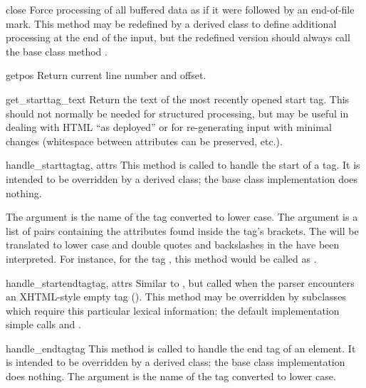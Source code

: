 \begin{methoddesc}{close}{}
Force processing of all buffered data as if it were followed by an
end-of-file mark.  This method may be redefined by a derived class to
define additional processing at the end of the input, but the
redefined version should always call the  base class
method .
\end{methoddesc}

\begin{methoddesc}{getpos}{}
Return current line number and offset.
\end{methoddesc}

\begin{methoddesc}{get_starttag_text}{}
Return the text of the most recently opened start tag.  This should
not normally be needed for structured processing, but may be useful in
dealing with HTML ``as deployed'' or for re-generating input with
minimal changes (whitespace between attributes can be preserved,
etc.).
\end{methoddesc}

\begin{methoddesc}{handle_starttag}{tag, attrs} 
This method is called to handle the start of a tag.  It is intended to
be overridden by a derived class; the base class implementation does
nothing.  

The  argument is the name of the tag converted to
lower case.  The  argument is a list of  pairs containing the attributes found inside the tag's
\code{<>} brackets.  The  will be translated to lower case
and double quotes and backslashes in the  have been
interpreted.  For instance, for the tag , this method would be called as
.
\end{methoddesc}

\begin{methoddesc}{handle_startendtag}{tag, attrs}
Similar to , but called when the parser
encounters an XHTML-style empty tag ().  This method
may be overridden by subclasses which require this particular lexical
information; the default implementation simple calls
 and .
\end{methoddesc}

\begin{methoddesc}{handle_endtag}{tag}
This method is called to handle the end tag of an element.  It is
intended to be overridden by a derived class; the base class
implementation does nothing.  The  argument is the name of
the tag converted to lower case.
\end{methoddesc}


